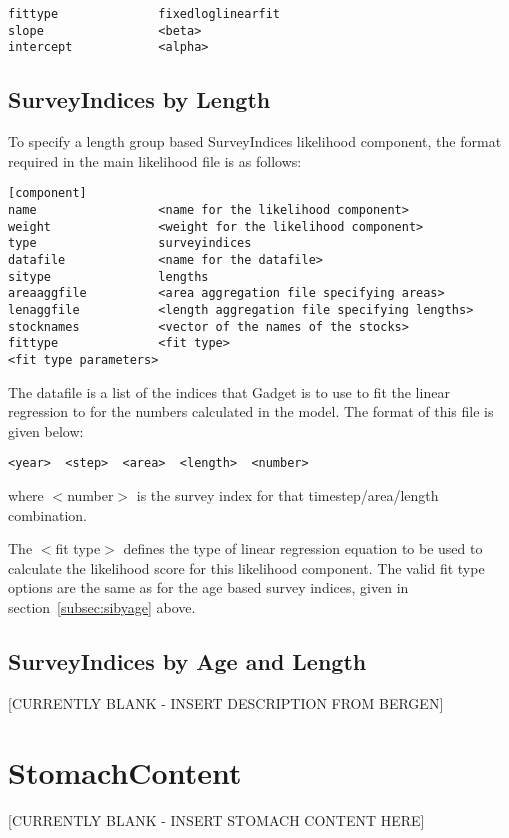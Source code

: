 \documentclass [a4paper, 10pt]{book}
\begin{document}
{\small\begin{verbatim}
fittype              fixedloglinearfit
slope                <beta>
intercept            <alpha>
\end{verbatim}}

\subsection{SurveyIndices by Length}\label{subsec:sibylength}
To specify a length group based SurveyIndices likelihood component, the format required in the main likelihood file is as follows:

{\small\begin{verbatim}
[component]
name                 <name for the likelihood component>
weight               <weight for the likelihood component>
type                 surveyindices
datafile             <name for the datafile>
sitype               lengths
areaaggfile          <area aggregation file specifying areas>
lenaggfile           <length aggregation file specifying lengths>
stocknames           <vector of the names of the stocks>
fittype              <fit type>
<fit type parameters>
\end{verbatim}}

The datafile is a list of the indices that Gadget is to use to fit the linear regression to for the numbers calculated in the model.  The format of this file is given below:

{\small\begin{verbatim}
<year>  <step>  <area>  <length>  <number>
\end{verbatim}}

where $<$number$>$ is the survey index for that timestep/area/length combination.

\bigskip
The $<$fit type$>$ defines the type of linear regression equation to be used to calculate the likelihood score for this likelihood component.  The valid fit type options are the same as for the age based survey indices, given in section~\ref{subsec:sibyage} above.

\subsection{SurveyIndices by Age and Length}\label{subsec:sibyageandlength}
[CURRENTLY BLANK - INSERT DESCRIPTION FROM BERGEN]

\section{StomachContent}\label{sec:stomach}
[CURRENTLY BLANK - INSERT STOMACH CONTENT HERE]
\end{document}
